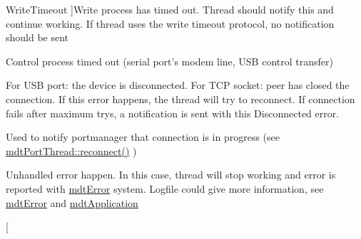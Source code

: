 \begin{Desc}
\begin{description}
{\hypertarget{classmdt_abstract_port_ad4121bb930c95887e77f8bafa065a85eac3a5cee51d4fb0b3bfb7c49604059c6a}{
WriteTimeout}
\label{classmdt_abstract_port_ad4121bb930c95887e77f8bafa065a85eac3a5cee51d4fb0b3bfb7c49604059c6a}
}]Write process has timed out. Thread should notify this and continue working. If thread uses the write timeout protocol, no notification should be sent \item[{\em 
\hypertarget{classmdt_abstract_port_ad4121bb930c95887e77f8bafa065a85eabdb5a36cd2c7dd2dcf59e996fc4922c9}{
ControlTimeout}
\label{classmdt_abstract_port_ad4121bb930c95887e77f8bafa065a85eabdb5a36cd2c7dd2dcf59e996fc4922c9}
}]Control process timed out (serial port's modem line, USB control transfer) \item[{\em 
\hypertarget{classmdt_abstract_port_ad4121bb930c95887e77f8bafa065a85ea8b70726d03f75a691ac4ad65722a5f3c}{
Disconnected}
\label{classmdt_abstract_port_ad4121bb930c95887e77f8bafa065a85ea8b70726d03f75a691ac4ad65722a5f3c}
}]For USB port: the device is disconnected. For TCP socket: peer has closed the connection. If this error happens, the thread will try to reconnect. If connection fails after maximum trys, a notification is sent with this Disconnected error. \item[{\em 
\hypertarget{classmdt_abstract_port_ad4121bb930c95887e77f8bafa065a85ea0edfb7a2f0daf9501874543ecaae8e93}{
Connecting}
\label{classmdt_abstract_port_ad4121bb930c95887e77f8bafa065a85ea0edfb7a2f0daf9501874543ecaae8e93}
}]Used to notify portmanager that connection is in progress (see \hyperlink{classmdt_port_thread_abee1d2f9b67ca37cfd13e108ca978b36}{mdtPortThread::reconnect()} ) \item[{\em 
\hypertarget{classmdt_abstract_port_ad4121bb930c95887e77f8bafa065a85ea6e24e272af4da51c84eef5825c5cd712}{
UnhandledError}
\label{classmdt_abstract_port_ad4121bb930c95887e77f8bafa065a85ea6e24e272af4da51c84eef5825c5cd712}
}]Unhandled error happen. In this case, thread will stop working and error is reported with \hyperlink{classmdt_error}{mdtError} system. Logfile could give more information, see \hyperlink{classmdt_error}{mdtError} and \hyperlink{classmdt_application}{mdtApplication} \item[{\em 
}
\end{description}
\end{Desc}
